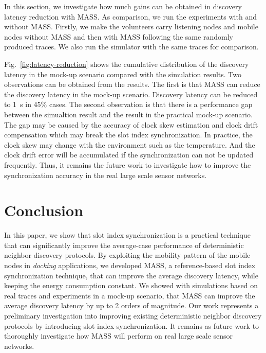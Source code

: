 \documentclass[twoside,twocolumn]{article}
\begin{document}
In this section, we investigate how much gains can be obtained in discovery latency reduction with
MASS. As comparison, we run the experiments with and without MASS. Firstly, we make the volunteers
carry listening nodes and mobile nodes without MASS and then with MASS following the same randomly
produced traces. We also run the simulator with the same traces for comparison.

Fig.~\ref{fig:latency-reduction} shows the cumulative distribution of the discovery latency in the
mock-up scenario compared with the simulation results. Two observations can be obtained from the
results. The first is that MASS can reduce the discovery latency in the mock-up scenario. Discovery
latency can be reduced to 1~s in 45\% cases. The second observation is that there is a performance
gap between the simualtion result and the result in the practical mock-up scenario. The gap may be
caused by the accuracy of clock skew estimation and clock drift compensation which may break the
slot index synchronization. In practice, the clock skew may change with the environment such as the 
temperature. And the clock drift error will be accumulated if the synchronization can not be updated 
frequently. Thus, it remains the future work to investigate how to improve the synchronization accuracy 
in the real large scale sensor networks.

\section{Conclusion}
\label{sec:conclusion}

In this paper, we show that slot index synchronization is a practical
technique that can significantly improve the average-case performance
of deterministic neighbor discovery protocols. By exploiting the
mobility pattern of the mobile nodes in \emph{docking} applications,
we developed MASS, a reference-based slot index synchronization
technique, that can improve the average discovery latency, while
keeping the energy consumption constant.  We showed with simulations
based on real traces and experiments in a mock-up scenario, that MASS 
can improve the average discovery latency by up to 2 orders of magnitude. 
Our work represents a preliminary investigation into improving existing 
deterministic neighbor discovery protocols by introducing slot index
synchronization. It remains as future work to thoroughly investigate
how MASS will perform on real large scale sensor networks.
\end{document}
